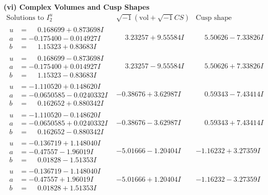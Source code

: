 \documentclass[1p]{elsarticle_modified}
\theoremstyle{definition}
\newcommand{\I}{\sqrt{-1}}
\begin{document}
\newpage\flushleft \textbf{(vi) Complex Volumes and Cusp Shapes}
$$\begin{array}{c|c|c}  
\text{Solutions to }I^u_{2}& \I (\text{vol} + \sqrt{-1}CS) & \text{Cusp shape}\\
 \hline 
\begin{aligned}
u &= \phantom{-}0.168699 + 0.873698 I \\
a &= -0.175400 - 0.014927 I \\
b &= \phantom{-}1.15323 + 0.83683 I\end{aligned}
 & \phantom{-}3.23257 + 9.55584 I & \phantom{-}5.50626 - 7.33826 I \\ \hline\begin{aligned}
u &= \phantom{-}0.168699 - 0.873698 I \\
a &= -0.175400 + 0.014927 I \\
b &= \phantom{-}1.15323 - 0.83683 I\end{aligned}
 & \phantom{-}3.23257 - 9.55584 I & \phantom{-}5.50626 + 7.33826 I \\ \hline\begin{aligned}
u &= -1.110520 + 0.148620 I \\
a &= -0.0650585 - 0.0240332 I \\
b &= \phantom{-}0.162652 + 0.880342 I\end{aligned}
 & -0.38676 + 3.62987 I & \phantom{-}0.59343 - 7.43414 I \\ \hline\begin{aligned}
u &= -1.110520 - 0.148620 I \\
a &= -0.0650585 + 0.0240332 I \\
b &= \phantom{-}0.162652 - 0.880342 I\end{aligned}
 & -0.38676 - 3.62987 I & \phantom{-}0.59343 + 7.43414 I \\ \hline\begin{aligned}
u &= -0.136719 + 1.148040 I \\
a &= -0.47557 - 1.96019 I \\
b &= \phantom{-}0.01828 - 1.51353 I\end{aligned}
 & -5.01666 - 1.20404 I & -1.16232 + 3.27359 I \\ \hline\begin{aligned}
u &= -0.136719 - 1.148040 I \\
a &= -0.47557 + 1.96019 I \\
b &= \phantom{-}0.01828 + 1.51353 I\end{aligned}
 & -5.01666 + 1.20404 I & -1.16232 - 3.27359 I \\ \hline\begin{aligned}

\end{aligned}
\end{array}$$
\end{document}
